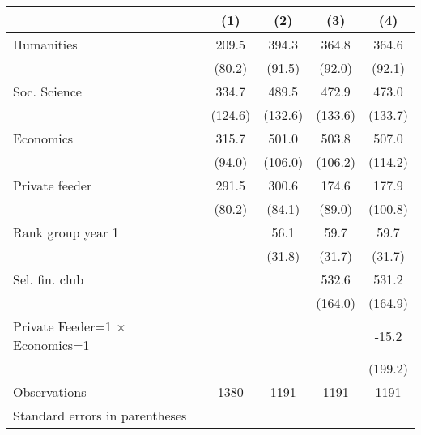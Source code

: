 \begin{tabular}{l*{4}{c}}
\toprule
                    &\multicolumn{1}{c}{(1)}&\multicolumn{1}{c}{(2)}&\multicolumn{1}{c}{(3)}&\multicolumn{1}{c}{(4)}\\
\midrule
Humanities          &       209.5&       394.3&       364.8&       364.6\\
                    &      (80.2)&      (91.5)&      (92.0)&      (92.1)\\
\addlinespace
Soc. Science        &       334.7&       489.5&       472.9&       473.0\\
                    &     (124.6)&     (132.6)&     (133.6)&     (133.7)\\
\addlinespace
Economics           &       315.7&       501.0&       503.8&       507.0\\
                    &      (94.0)&     (106.0)&     (106.2)&     (114.2)\\
\addlinespace
Private feeder      &       291.5&       300.6&       174.6&       177.9\\
                    &      (80.2)&      (84.1)&      (89.0)&     (100.8)\\
\addlinespace
Rank group year 1   &            &        56.1&        59.7&        59.7\\
                    &            &      (31.8)&      (31.7)&      (31.7)\\
\addlinespace
Sel. fin. club      &            &            &       532.6&       531.2\\
                    &            &            &     (164.0)&     (164.9)\\
\addlinespace
Private Feeder=1 $\times$ Economics=1&            &            &            &       -15.2\\
                    &            &            &            &     (199.2)\\
\midrule
Observations        &        1380&        1191&        1191&        1191\\
\bottomrule
\multicolumn{5}{l}{\footnotesize Standard errors in parentheses}\\
\end{tabular}
